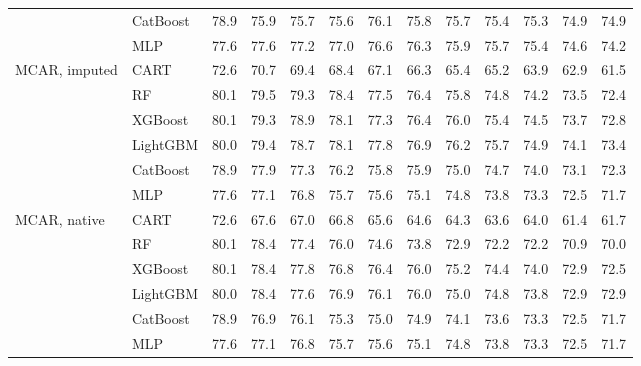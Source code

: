 \begin{table}[p]
\begin{tabular}{@{}llrrrrrrrrrrr@{}}
 & CatBoost & 78.9 & 75.9 & 75.7 & 75.6 & 76.1 & 75.8 & 75.7 & 75.4 & 75.3 & 74.9 & 74.9 \\
 & MLP & 77.6 & 77.6 & 77.2 & 77.0 & 76.6 & 76.3 & 75.9 & 75.7 & 75.4 & 74.6 & 74.2 \\
\midrule
MCAR, imputed & CART & 72.6 & 70.7 & 69.4 & 68.4 & 67.1 & 66.3 & 65.4 & 65.2 & 63.9 & 62.9 & 61.5 \\
 & RF & 80.1 & 79.5 & 79.3 & 78.4 & 77.5 & 76.4 & 75.8 & 74.8 & 74.2 & 73.5 & 72.4 \\
 & XGBoost & 80.1 & 79.3 & 78.9 & 78.1 & 77.3 & 76.4 & 76.0 & 75.4 & 74.5 & 73.7 & 72.8 \\
 & LightGBM & 80.0 & 79.4 & 78.7 & 78.1 & 77.8 & 76.9 & 76.2 & 75.7 & 74.9 & 74.1 & 73.4 \\
 & CatBoost & 78.9 & 77.9 & 77.3 & 76.2 & 75.8 & 75.9 & 75.0 & 74.7 & 74.0 & 73.1 & 72.3 \\
 & MLP & 77.6 & 77.1 & 76.8 & 75.7 & 75.6 & 75.1 & 74.8 & 73.8 & 73.3 & 72.5 & 71.7 \\
\midrule
MCAR, native & CART & 72.6 & 67.6 & 67.0 & 66.8 & 65.6 & 64.6 & 64.3 & 63.6 & 64.0 & 61.4 & 61.7 \\
 & RF & 80.1 & 78.4 & 77.4 & 76.0 & 74.6 & 73.8 & 72.9 & 72.2 & 72.2 & 70.9 & 70.0 \\
 & XGBoost & 80.1 & 78.4 & 77.8 & 76.8 & 76.4 & 76.0 & 75.2 & 74.4 & 74.0 & 72.9 & 72.5 \\
 & LightGBM & 80.0 & 78.4 & 77.6 & 76.9 & 76.1 & 76.0 & 75.0 & 74.8 & 73.8 & 72.9 & 72.9 \\
 & CatBoost & 78.9 & 76.9 & 76.1 & 75.3 & 75.0 & 74.9 & 74.1 & 73.6 & 73.3 & 72.5 & 71.7 \\
 & MLP & 77.6 & 77.1 & 76.8 & 75.7 & 75.6 & 75.1 & 74.8 & 73.8 & 73.3 & 72.5 & 71.7 \\
\bottomrule
\end{tabular}
\end{table}

